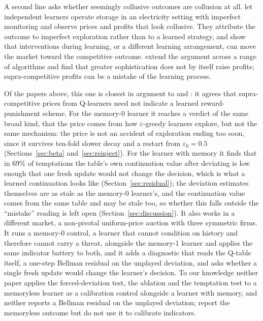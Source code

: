 A second line asks whether seemingly collusive outcomes are collusion at all. \citet{abada2023} let independent learners operate storage in an electricity setting with imperfect monitoring and observe prices and profits that look collusive. They attribute the outcome to imperfect exploration rather than to a learned strategy, and show that interventions during learning, or a different learning arrangement, can move the market toward the competitive outcome. \citet{abada2024} extend the argument across a range of algorithms and find that greater sophistication does not by itself raise profits; supra-competitive profits can be a mistake of the learning process. 

Of the papers above, this one is closest in argument to \citet{abada2023} and \citet{abada2024}: it agrees that supra-competitive prices from Q-learners need not indicate a learned reward-punishment scheme. For the memory-0 learner it reaches a verdict of the same broad kind, that the price comes from how $\varepsilon$-greedy learners explore, but not the same mechanism: the price is not an accident of exploration ending too soon, since it survives ten-fold slower decay and a restart from $\varepsilon_0 = 0.5$ (Sections~\ref{sec:beta} and~\ref{sec:reinject}). For the learner with memory it finds that in 69\% of temptations the table's own continuation value after deviating is low enough that one fresh update would not change the decision, which is what a learned continuation looks like (Section~\ref{sec:residual}); the deviation estimates themselves are as stale as the memory-0 learner's, and the continuation value comes from the same table and may be stale too, so whether this falls outside the ``mistake'' reading is left open (Section~\ref{sec:discussion}). It also works in a different market, a non-pivotal uniform-price auction with three symmetric firms. It runs a memory-0 control, a learner that cannot condition on history and therefore cannot carry a threat, alongside the memory-1 learner and applies the same indicator battery to both, and it adds a diagnostic that reads the Q-table itself, a one-step Bellman residual on the unplayed deviation, and asks whether a single fresh update would change the learner's decision. To our knowledge neither paper applies the forced-deviation test, the ablation and the temptation test to a memoryless learner as a calibration control alongside a learner with memory, and neither reports a Bellman residual on the unplayed deviation; \citet{waltman2008} report the memoryless outcome but do not use it to calibrate indicators.

